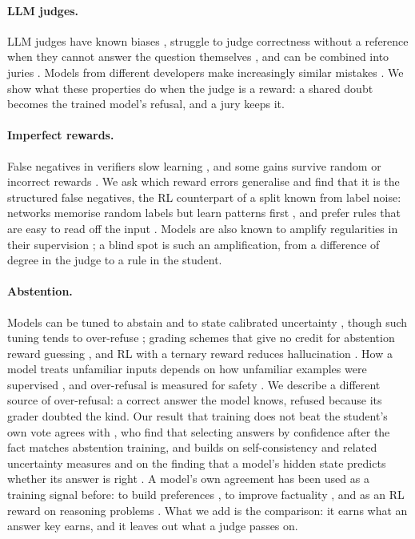 \documentclass[11pt,a4paper,twocolumn]{article}
\begin{document}
\paragraph{LLM judges.} LLM judges have known biases \citep{zheng2023}, struggle to judge correctness without a reference when they cannot answer the question themselves \citep{krumdick2025}, and can be combined into juries \citep{verga2024}. Models from different developers make increasingly similar mistakes \citep{goel2025}. We show what these properties do when the judge is a reward: a shared doubt becomes the trained model's refusal, and a jury keeps it.

\paragraph{Imperfect rewards.} False negatives in verifiers slow learning \citep{xu2025tinyv}, and some gains survive random or incorrect rewards \citep{shao2025spurious}. We ask which reward errors generalise and find that it is the structured false negatives, the RL counterpart of a split known from label noise: networks memorise random labels but learn patterns first \citep{zhang2017,arpit2017,rolnick2017}, and prefer rules that are easy to read off the input \citep{geirhos2020}. Models are also known to amplify regularities in their supervision \citep{zhao2017}; a blind spot is such an amplification, from a difference of degree in the judge to a rule in the student.

\paragraph{Abstention.} Models can be tuned to abstain \citep{zhang2024rtuning,xu2024rlkf} and to state calibrated uncertainty \citep{kapoor2024}, though such tuning tends to over-refuse \citep{zhu2025river}; grading schemes that give no credit for abstention reward guessing \citep{kalai2025}, and RL with a ternary reward reduces hallucination \citep{wei2025truthrl}. How a model treats unfamiliar inputs depends on how unfamiliar examples were supervised \citep{gekhman2024,kang2024}, and over-refusal is measured for safety \citep{rottger2024,cui2024}. We describe a different source of over-refusal: a correct answer the model knows, refused because its grader doubted the kind. Our result that training does not beat the student's own vote agrees with \citet{zhang2026taps}, who find that selecting answers by confidence after the fact matches abstention training, and builds on self-consistency and related uncertainty measures \citep{wang2023sc,kuhn2023,manakul2023} and on the finding that a model's hidden state predicts whether its answer is right \citep{azaria2023,burns2023}. A model's own agreement has been used as a training signal before: to build preferences \citep{prasad2024scpo}, to improve factuality \citep{zhang2024selfalign,tian2024}, and as an RL reward on reasoning problems \citep{zuo2025ttrl,shafayat2025}. What we add is the comparison: it earns what an answer key earns, and it leaves out what a judge passes on.
\end{document}

